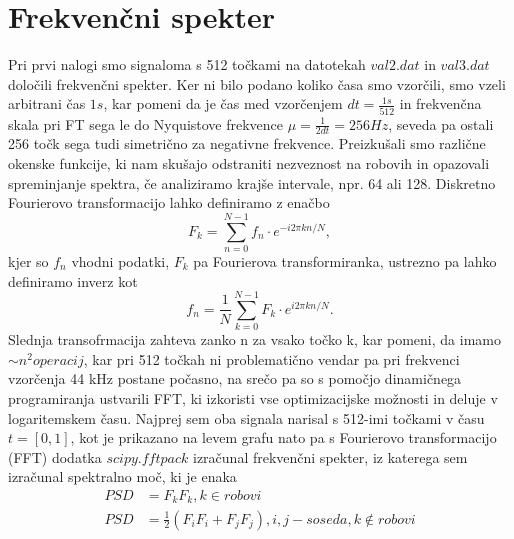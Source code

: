 \documentclass[11pt, a4paper]{article}
\begin{document}
\section{Frekvenčni spekter}
Pri prvi nalogi smo signaloma s 512 točkami na datotekah $val2.dat$ in $val3.dat$ določili frekvenčni spekter. Ker ni bilo podano koliko časa smo vzorčili, smo vzeli arbitrani čas $1s$, kar pomeni da je čas med vzorčenjem $dt = \frac{1s}{512}$ in frekvenčna skala pri FT sega le do Nyquistove frekvence $\mu = \frac{1}{2 dt} = 256 Hz$, seveda pa ostali 256 točk sega tudi simetrično za negativne frekvence. Preizkušali smo različne okenske funkcije, ki nam skušajo odstraniti nezveznost na robovih in opazovali spreminjanje spektra, če analiziramo krajše intervale, npr. 64 ali 128.\newline
Diskretno Fourierovo transformacijo lahko definiramo z enačbo
\begin{equation}
F_k =  \sum_{n=0}^{N-1} f_n \cdot e^{-i 2 \pi k n / N}, 
\end{equation}
kjer so $f_n$ vhodni podatki, $F_k$ pa Fourierova transformiranka, ustrezno pa lahko definiramo inverz kot
\begin{equation}
f_n = \frac{1}{N} \sum_{k=0}^{N-1} F_k \cdot e^{i 2 \pi k n / N}.
\end{equation}
Slednja transofrmacija zahteva zanko n za vsako točko k, kar pomeni, da imamo $\sim n^2 operacij$, kar pri 512 točkah ni problematično vendar pa pri frekvenci vzorčenja 44 kHz postane počasno, na srečo pa so s pomočjo dinamičnega programiranja ustvarili FFT, ki izkoristi vse optimizacijske možnosti in deluje v logaritemskem času. \newline\newline
Najprej sem oba signala narisal s 512-imi točkami v času $t=[0,1]$, kot je prikazano na levem grafu nato pa s Fourierovo transformacijo (FFT) dodatka $scipy.fftpack$ izračunal frekvenčni spekter, iz katerega sem izračunal spektralno moč, ki je enaka
\begin{equation}
\begin{split}
PSD &= F_kF_k , k \in robovi \\
PSD &= \frac{1}{2}(F_iF_i + F_jF_j), i,j - soseda, k  \not \in robovi 
\end{split}
\end{equation} 
\end{document}
